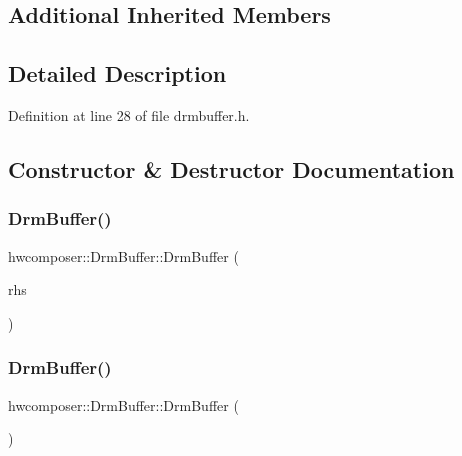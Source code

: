 \subsection*{Additional Inherited Members}


\subsection{Detailed Description}


Definition at line 28 of file drmbuffer.\+h.



\subsection{Constructor \& Destructor Documentation}
\mbox{\label{classhwcomposer_1_1DrmBuffer_a9e23026b53d528ccd9f1a71fbc153ef1}} 
\subsubsection{\texorpdfstring{Drm\+Buffer()}{DrmBuffer()}\hspace{0.1cm}{\footnotesize\ttfamily [1/2]}}
{\footnotesize\ttfamily hwcomposer\+::\+Drm\+Buffer\+::\+Drm\+Buffer (\begin{DoxyParamCaption}\item[{\mbox{\hyperlink{classhwcomposer_1_1DrmBuffer}{Drm\+Buffer}} \&\&}]{rhs }\end{DoxyParamCaption})\hspace{0.3cm}{\ttfamily [default]}}

\mbox{\label{classhwcomposer_1_1DrmBuffer_a74144267227d5213648330cd9d9a6bfe}} 
\subsubsection{\texorpdfstring{Drm\+Buffer()}{DrmBuffer()}\hspace{0.1cm}{\footnotesize\ttfamily [2/2]}}
{\footnotesize\ttfamily hwcomposer\+::\+Drm\+Buffer\+::\+Drm\+Buffer (\begin{DoxyParamCaption}{ }\end{DoxyParamCaption})\hspace{0.3cm}{\ttfamily [default]}}

